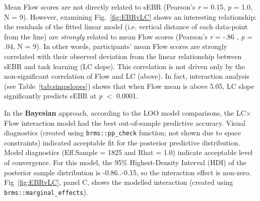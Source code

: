\documentclass[10pt,letterpaper,floatsintext]{article}
\begin{document}
Mean Flow scores are not directly related to sEBR (Pearson's {\it r} = 0.15, {\it p} = 1.0, N = 9). %
However, examining Fig.~\ref{fig:EBRvLC} shows an interesting relationship: the residuals of the fitted linear model (i.e. vertical distance of each data-point from the line) are {\it strongly} related to mean Flow scores (Pearson's {\it r} = -.86 , {\it p} = .04, N = 9). %
In other words, participants' mean Flow scores are strongly correlated with their observed deviation from the linear relationship between sEBR and task learning (LC slope). This correlation is not driven only by the non-significant correlation of Flow and LC (above). In fact, interaction analysis (see Table~\ref{tab:simpslopes}) shows that when Flow mean is above 5.05, LC slope significantly predicts sEBR at {\it p} $<$ 0.0001. %

In the \textbf{Bayesian} approach, according to the LOO model comparisons, the LC$\times$Flow interaction model had the best out-of-sample predictive accuracy. Visual diagnostics (created using \verb|brms::pp_check| function; not shown due to space constraints) indicated acceptable fit for the posterior predictive distribution. Model diagnostics (Eff.Sample = 1825 and Rhat = 1.0) indicate acceptable level of convergence. For this model, the 95\% Highest-Density Interval (HDI) of the posterior sample distribution is -0.86..-0.15, so the interaction effect is non-zero. Fig~\ref{fig:EBRvLC}, panel C, shows the modelled interaction (created using \verb|brms::marginal_effects|).
\end{document}

